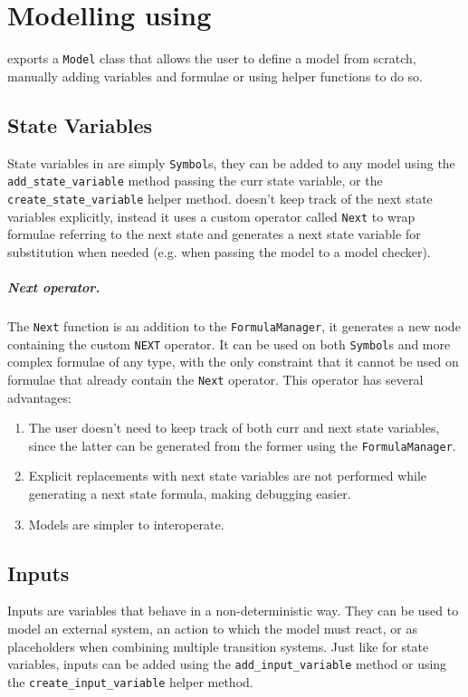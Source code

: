 \chapter{Modelling using \pyvmt{}}
\label{ch:modelling}

\pyvmt{} exports a \texttt{Model} class that allows the user to define a model from scratch, manually adding variables and formulae or using helper functions to do so.


\section{State Variables}
State variables in \pyvmt{} are simply \pysmt{} \texttt{Symbol}s, they can be added to any model using the \texttt{add\_state\_variable} method passing the curr state variable, or the \texttt{create\_state\_variable} helper method.
\pyvmt{} doesn't keep track of the next state variables explicitly, instead it uses a custom operator called \texttt{Next} to wrap formulae referring to the next state and generates a next state variable for substitution when needed (e.g. when passing the model to a model checker).

\paragraph*{Next operator.} The \texttt{Next} function is an addition to the \pysmt{} \texttt{FormulaManager}, it generates a new node containing the custom \texttt{NEXT} operator. It can be used on both \texttt{Symbol}s and more complex formulae of any type, with the only constraint that it cannot be used on formulae that already contain the \texttt{Next} operator. This operator has several advantages:
\begin{enumerate}
    \item The user doesn't need to keep track of both curr and next state variables, since the latter can be generated from the former using the \texttt{FormulaManager}.
    \item Explicit replacements with next state variables are not performed while generating a next state formula, making debugging easier.
    \item Models are simpler to interoperate.
\end{enumerate}

\section{Inputs}
Inputs are variables that behave in a non-deterministic way. They can be used to model an external system, an action to which the model must react, or as placeholders when combining multiple transition systems.
Just like for state variables, inputs can be added using the \texttt{add\_input\_variable} method or using the \texttt{create\_input\_variable} helper method.

